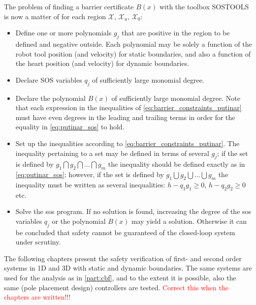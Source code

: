 The problem of finding a barrier certificate $B(x)$ with the toolbox SOSTOOLS is now a matter of for each region $\mathcal{X}$, $\mathcal{X}_u$, $\mathcal{X}_0$:
\vspace*{-2mm}
\begin{itemize}
\itemsep-0.7mm
\item Define one or more polynomials $g_j$ that are positive in the region to be defined and negative outside. Each polynomial may be solely a function of the robot tool position (and velocity) for static boundaries, and also a function of the heart position (and velocity) for dynamic boundaries.
\item Declare SOS variables $q_j$ of sufficiently large monomial degree.
\item Declare the polynomial $B(x)$ of sufficiently large monomial degree. Note that each expression in the inequalities of \autoref{eq:barrier_constraints_putinar} must have even degrees in the leading and trailing terms in order for the equality in \autoref{eq:putinar_sos} to hold.
\item Set up the inequalities according to \autoref{eq:barrier_constraints_putinar}. The inequality pertaining to a set may be defined in terms of several $g_j$; if the set is defined by $g_1 \bigcap g_2 \bigcap ... \bigcap g_m$ the inequality should be defined exactly as in \autoref{eq:putinar_sos}; however, if the set is defined by $g_1 \bigcup g_2 \bigcup ... \bigcup g_m$ the inequality must be written as several inequalities: $h - q_1g_1\geq 0$, $h - q_2g_2\geq 0$ etc.
\item Solve the \gls{sos} program. If no solution is found, increasing the degree of the \gls{sos} variables $q_j$ or the polynomial $B(x)$ may yield a solution. Otherwise it can be concluded that safety cannot be guaranteed of the closed-loop system under scrutiny.
\end{itemize}



The following chapters present the safety verification of first- and second order systems in 1D and 3D with static and dynamic boundaries. The same systems are used for the analysis as in \autoref{part:cbf}, and to the extent it is possible, also the same (pole placement design) controllers are tested. \textcolor{red}{Correct this when the chapters are written!!!}

 
	






